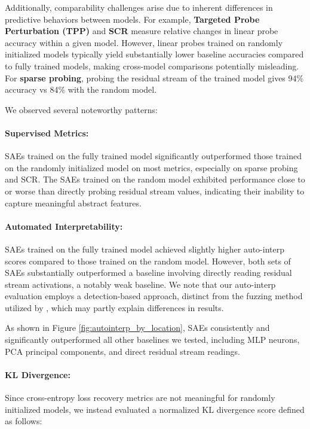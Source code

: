 \documentclass{article}
\theoremstyle{plain}
\theoremstyle{definition}
\theoremstyle{remark}
\begin{document}
Additionally, comparability challenges arise due to inherent differences in predictive behaviors between models. For example, \textbf{Targeted Probe Perturbation (TPP)} and \textbf{SCR} measure relative changes in linear probe accuracy within a given model. However, linear probes trained on randomly initialized models typically yield substantially lower baseline accuracies compared to fully trained models, making cross-model comparisons potentially misleading. For \textbf{sparse probing}, probing the residual stream of the trained model gives 94\% accuracy vs 84\% with the random model.

We observed several noteworthy patterns:

\paragraph{Supervised Metrics:} SAEs trained on the fully trained model significantly outperformed those trained on the randomly initialized model on most metrics, especially on sparse probing and SCR. The SAEs trained on the random model exhibited performance close to or worse than directly probing residual stream values, indicating their inability to capture meaningful abstract features.

\paragraph{Automated Interpretability:} SAEs trained on the fully trained model achieved slightly higher auto-interp scores compared to those trained on the random model. However, both sets of SAEs substantially outperformed a baseline involving directly reading residual stream activations, a notably weak baseline. We note that our auto-interp evaluation employs a detection-based approach, distinct from the fuzzing method utilized by \citet{heap2025sparseautoencodersinterpretrandomly}, which may partly explain differences in results.

As shown in Figure \ref{fig:autointerp_by_location}, SAEs consistently and significantly outperformed all other baselines we tested, including MLP neurons, PCA principal components, and direct residual stream readings.

\paragraph{KL Divergence:} Since cross-entropy loss recovery metrics are not meaningful for randomly initialized models, we instead evaluated a normalized KL divergence score defined as follows:
\end{document}
